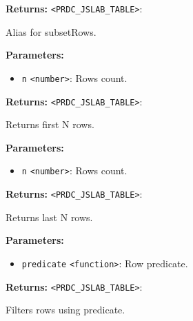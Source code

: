 \documentclass[12pt,a4paper]{article}
\begin{document}
\noindent \textbf{Returns:} \texttt{<PRDC\_JSLAB\_TABLE>}:

\noindent Alias for subsetRows.

\vspace{5mm}
\noindent {}


\noindent \textbf{Parameters:}
\begin{itemize}
  \item \texttt{n} \texttt{<number>}: Rows count.
\end{itemize}

\noindent \textbf{Returns:} \texttt{<PRDC\_JSLAB\_TABLE>}:

\noindent Returns first N rows.

\vspace{5mm}
\noindent {}


\noindent \textbf{Parameters:}
\begin{itemize}
  \item \texttt{n} \texttt{<number>}: Rows count.
\end{itemize}

\noindent \textbf{Returns:} \texttt{<PRDC\_JSLAB\_TABLE>}:

\noindent Returns last N rows.

\vspace{5mm}
\noindent {}


\noindent \textbf{Parameters:}
\begin{itemize}
  \item \texttt{predicate} \texttt{<function>}: Row predicate.
\end{itemize}

\noindent \textbf{Returns:} \texttt{<PRDC\_JSLAB\_TABLE>}:

\noindent Filters rows using predicate.

\vspace{5mm}
\noindent {}
\end{document}
